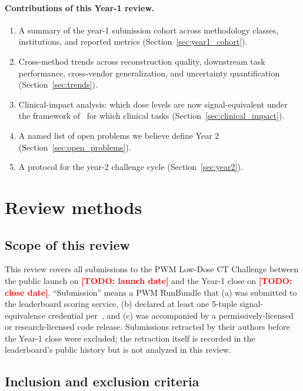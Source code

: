 \documentclass[twoside,11pt]{article}
\newcommand{\todo}[1]{\textcolor{red}{\textbf{[TODO: #1]}}}
\begin{document}
\paragraph{Contributions of this Year-1 review.}
\begin{enumerate}
    \item A summary of the year-1 submission cohort across methodology classes, institutions, and reported metrics (Section~\ref{sec:year1_cohort}).
    \item Cross-method trends across reconstruction quality, downstream task performance, cross-vendor generalization, and uncertainty quantification (Section~\ref{sec:trends}).
    \item Clinical-impact analysis: which dose levels are now signal-equivalent under the framework of~\citep{ws2framework} for which clinical tasks (Section~\ref{sec:clinical_impact}).
    \item A named list of open problems we believe define Year 2 (Section~\ref{sec:open_problems}).
    \item A protocol for the year-2 challenge cycle (Section~\ref{sec:year2}).
\end{enumerate}

\section{Review methods}
\label{sec:review_methods}

\subsection{Scope of this review}

This review covers all submissions to the PWM Low-Dose CT Challenge between the public launch on \todo{launch date} and the Year-1 close on \todo{close date}. ``Submission'' means a PWM RunBundle that (a) was submitted to the leaderboard scoring service, (b) declared at least one 5-tuple signal-equivalence credential per~\citep{ws2framework}, and (c) was accompanied by a permissively-licensed or research-licensed code release. Submissions retracted by their authors before the Year-1 close were excluded; the retraction itself is recorded in the leaderboard's public history but is not analyzed in this review.

\subsection{Inclusion and exclusion criteria}
\end{document}
